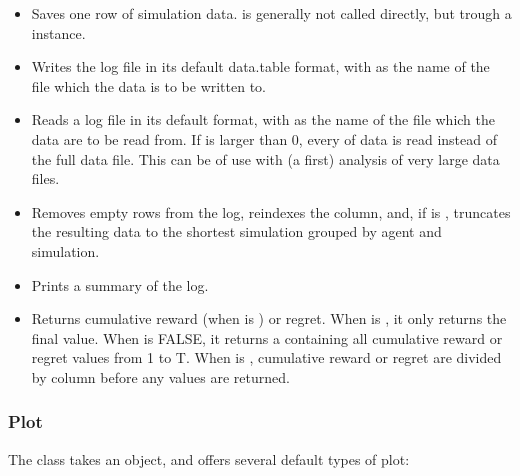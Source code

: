 \documentclass[nojss]{jss}\usepackage[]{graphicx}\usepackage[]{color}
\begin{document}
\begin{itemize}
 \item{}{
    Saves one row of simulation data.  is generally not called directly, but trough a  instance.
 }
 \item{}{
    Writes the  log file in its default data.table format,
    with  as the name of the file which the data is to be written to.
 }
 \item{}{
    Reads a  log file in its default  format,
    with  as the name of the file which the data are to be read from.
    If  is larger than 0, every  of data is read instead of the
    full data file. This can be of use with (a first) analysis of very large data files.
 }
 \item{}{
    Removes empty rows from the  log, reindexes the  column, and,
    if  is , truncates the resulting data to the shortest simulation
    grouped by agent and simulation.
 }
 \item{}{
    Prints a summary of the  log.
 }
 \item{}{
    Returns cumulative reward (when  is ) or regret. When  is ,
    it only returns the final value. When  is FALSE, it returns a  containing all
    cumulative reward or regret values from 1 to T.
    When  is , cumulative reward or regret are divided by column  before any values
    are returned.
 }
\end{itemize}

\subsubsection{Plot}

The  class takes an  object, and offers several default types of plot:
\end{document}
